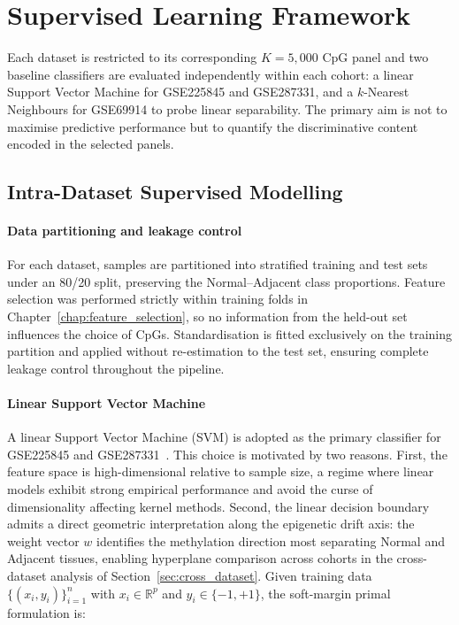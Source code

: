 \section{Supervised Learning Framework}

Each dataset is restricted to its corresponding $K = 5{,}000$
CpG panel and two baseline classifiers are evaluated
independently within each cohort: a linear Support Vector
Machine for GSE225845 and GSE287331, and a $k$-Nearest
Neighbours for GSE69914 to probe linear separability.
The primary aim is not to maximise predictive performance
but to quantify the discriminative content encoded in the
selected panels.


\subsection{Intra-Dataset Supervised Modelling}
\label{sec:intra_modelling}

\paragraph{Data partitioning and leakage control}

For each dataset, samples are partitioned into stratified
training and test sets under an 80/20 split, preserving the
Normal--Adjacent class proportions. Feature selection was
performed strictly within training folds in
Chapter~\ref{chap:feature_selection}, so no information from
the held-out set influences the choice of CpGs. Standardisation
is fitted exclusively on the training partition and applied
without re-estimation to the test set, ensuring complete
leakage control throughout the pipeline.

\paragraph{Linear Support Vector Machine}

A linear Support Vector Machine (SVM) is adopted as the
primary classifier for GSE225845 and
GSE287331~\cite{cortes1995svm}. This choice is motivated by
two reasons. First, the feature space is high-dimensional
relative to sample size, a regime where linear models exhibit
strong empirical performance and avoid the curse of
dimensionality affecting kernel methods. Second, the linear
decision boundary admits a direct geometric interpretation
along the epigenetic drift axis: the weight vector $w$
identifies the methylation direction most separating Normal
and Adjacent tissues, enabling hyperplane comparison across
cohorts in the cross-dataset analysis of
Section~\ref{sec:cross_dataset}.
\noindent Given training data $\{(x_i, y_i)\}_{i=1}^n$ with
$x_i \in \mathbb{R}^p$ and $y_i \in \{-1,+1\}$, the soft-margin
primal formulation is:

